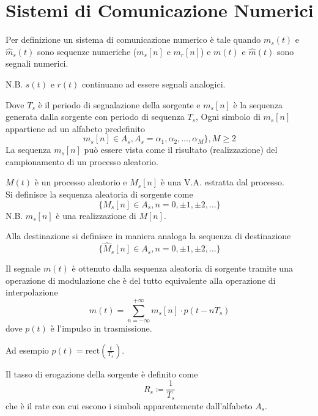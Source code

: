 
\section*{Sistemi di Comunicazione Numerici}
Per definizione un sistema di comunicazione numerico è tale quando \( m_s(t) \) e \( \hat{m}_s(t)\) sono sequenze numeriche (\( m_s[n] \) e \( m_r[n] \)) e \( m(t) \) e \( \hat{m}(t) \) sono segnali numerici.

N.B. \( s(t) \) e \( r(t) \) continuano ad essere segnali analogici.

\begin{center}
\end{center}
Dove
\( T_s \) è il periodo di segnalazione della sorgente e
\( m_s[n] \) è la sequenza generata dalla sorgente con periodo di sequenza \( T_s \),
Ogni simbolo di \( m_s[n] \) appartiene ad un alfabeto predefinito
\[ m_s[n] \in A_s ,  A_s = \alpha_1, \alpha_2, \ldots, \alpha_M\} ,  M \geq 2  \]La sequenza \( m_s[n] \) può essere vista come il risultato (realizzazione) del campionamento di un processo aleatorio.



\( M(t) \) è un processo aleatorio e \( M_s[n] \) è una V.A. estratta dal processo. \\
Si definisce la sequenza aleatoria di sorgente come
\[ \{ M_s[n] \in A_s, n = 0, \pm 1, \pm 2, \ldots \} \]
N.B. \( m_s[n] \) è una realizzazione di \( M[n] \).

Alla destinazione si definisce in maniera analoga la sequenza di destinazione
\[ \{ \hat{M}_s[n] \in A_s, n = 0, \pm 1, \pm 2, \ldots \} \]

Il segnale \( m(t) \) è ottenuto dalla sequenza aleatoria di sorgente tramite una operazione di modulazione che è del tutto equivalente alla operazione di interpolazione
\[ m(t) = \sum_{n=-\infty}^{+\infty} m_s[n]\cdot p(t - nT_s) \]
dove \( p(t) \) è l'impulso in trasmissione.

Ad esempio \( p(t) = \text{rect}\left(\frac{t}{T_s}\right) \).

Il tasso di erogazione della sorgente è definito come
\[ R_s \coloneqq \frac{1}{T_s} \]
che è il rate con cui escono i simboli apparentemente dall'alfabeto \( A_s \).

